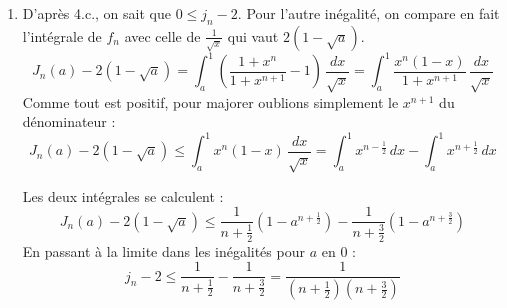 \begin{enumerate}
\item D'après 4.c., on sait que $0\leq j_n -2$. Pour l'autre inégalité, on compare en fait l'intégrale de $f_{n}$ avec celle de $\frac{1}{\sqrt{x}}$ qui vaut $2(1-\sqrt{a})$.
\begin{displaymath}
 J_{n}(a)-2(1-\sqrt{a})=\int_{a}^{1}\left(\frac{1+x^{n}}{1+x^{n+1}}-1\right )\,\frac{dx}{\sqrt{x}} = \int_{a}^{1}\frac{x^{n}(1-x)}{1+x^{n+1}}\,\frac{dx}{\sqrt{x}}
\end{displaymath}
Comme tout est positif, pour majorer oublions simplement le $x^{n+1}$ du dénominateur :
\begin{displaymath}
 J_{n}(a)-2(1-\sqrt{a})\leq \int_{a}^{1}x^{n}(1-x)\,\frac{dx}{\sqrt{x}} = \int_{a}^{1}x^{n-\frac{1}{2}}\,dx-\int_{a}^{1}x^{n+\frac{1}{2}}\,dx 
\end{displaymath}

Les deux intégrales se calculent :
\begin{displaymath}
  J_{n}(a)-2(1-\sqrt{a})\leq \frac{1}{n+\frac{1}{2}}\left( 1-a^{n+\frac{1}{2}} \right) -\frac{1}{n+\frac{3}{2}} \left( 1-a^{n+\frac{3}{2}} \right) 
\end{displaymath}
En passant à la limite dans les inégalités pour $a$ en $0$ :
\begin{displaymath}
 j_n -2 \leq \frac{1}{n+\frac{1}{2}} -\frac{1}{n+\frac{3}{2}} =\frac{1}{( n+\frac{1}{2})( n+\frac{3}{2})}
\end{displaymath}
\end{enumerate}
